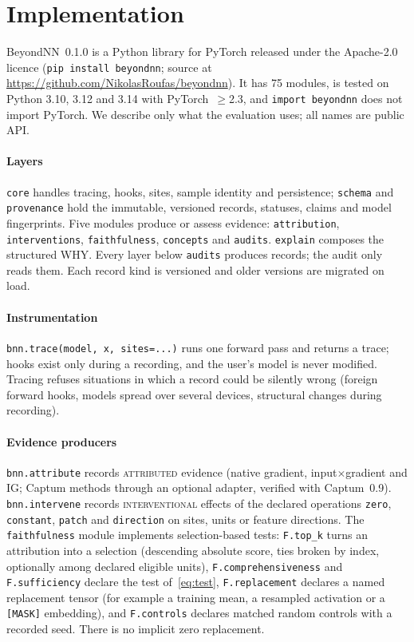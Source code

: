 \section{Implementation}
\label{sec:system}

BeyondNN~0.1.0 is a Python library for PyTorch released under the Apache-2.0 licence (\texttt{pip install beyondnn}; source at \url{https://github.com/NikolasRoufas/beyondnn}). It has 75 modules, is tested on Python 3.10, 3.12 and 3.14 with PyTorch~$\ge$2.3, and \texttt{import beyondnn} does not import PyTorch. We describe only what the evaluation uses; all names are public API.

\paragraph*{Layers}
\texttt{core} handles tracing, hooks, sites, sample identity and persistence; \texttt{schema} and \texttt{provenance} hold the immutable, versioned records, statuses, claims and model fingerprints. Five modules produce or assess evidence: \texttt{attribution}, \texttt{interventions}, \texttt{faithfulness}, \texttt{concepts} and \texttt{audits}. \texttt{explain} composes the structured WHY. Every layer below \texttt{audits} produces records; the audit only reads them. Each record kind is versioned and older versions are migrated on load.

\paragraph*{Instrumentation}
\texttt{bnn.trace(model, x, sites=...)} runs one forward pass and returns a trace; hooks exist only during a recording, and the user's model is never modified. Tracing refuses situations in which a record could be silently wrong (foreign forward hooks, models spread over several devices, structural changes during recording).

\paragraph*{Evidence producers}
\texttt{bnn.attribute} records \textsc{attributed} evidence (native gradient, input$\times$gradient and IG; Captum methods through an optional adapter, verified with Captum~0.9). \texttt{bnn.intervene} records \textsc{interventional} effects of the declared operations \texttt{zero}, \texttt{constant}, \texttt{patch} and \texttt{direction} on sites, units or feature directions. The \texttt{faithfulness} module implements selection-based tests: \texttt{F.top\_k} turns an attribution into a selection (descending absolute score, ties broken by index, optionally among declared eligible units), \texttt{F.comprehensiveness} and \texttt{F.sufficiency} declare the test of~\eqref{eq:test}, \texttt{F.replacement} declares a named replacement tensor (for example a training mean, a resampled activation or a \texttt{[MASK]} embedding), and \texttt{F.controls} declares matched random controls with a recorded seed. There is no implicit zero replacement.

